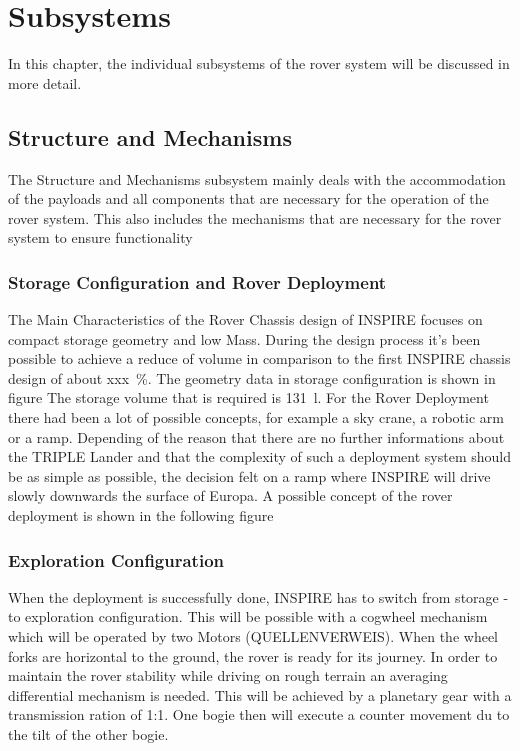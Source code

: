 \chapter{Subsystems}
\label{chap:subsystems}

In this chapter, the individual subsystems of the rover system will be discussed in more detail.

\section{Structure and Mechanisms}
\label{sec:mechanics}

The Structure and Mechanisms subsystem mainly deals with the accommodation of the payloads and all components that are necessary for the operation of the rover system. This also includes the mechanisms that are necessary for the rover system to ensure functionality 

\subsection{Storage Configuration and Rover Deployment}

The Main Characteristics of the Rover Chassis design of INSPIRE focuses on compact storage geometry and low Mass. 
During the design process it's been possible to achieve a reduce of volume in comparison to the first INSPIRE chassis design of about xxx~\%.
The geometry data in storage configuration is shown in figure %
The storage volume that is required is 131~l.
For the Rover Deployment there had been a lot of possible concepts, for example a sky crane, a robotic arm or a ramp. Depending of the reason that there are no further informations about the TRIPLE Lander and that the complexity of such a deployment system should be as simple as possible, the decision felt on a ramp where INSPIRE will drive slowly downwards the surface of Europa. 
A possible concept of the rover deployment is shown in the following figure %

\subsection{Exploration Configuration}

When the deployment is successfully done, INSPIRE has to switch from storage - to exploration configuration.
This will be possible with a cogwheel mechanism which will be operated by two Motors (QUELLENVERWEIS). When the wheel forks are horizontal to the ground, the rover is ready for its journey.
In order to maintain the rover stability while driving on rough terrain an averaging differential mechanism is needed.
This will be achieved by a planetary gear with a transmission ration of 1:1.
One bogie then will execute a counter movement du to the tilt of the other bogie.

